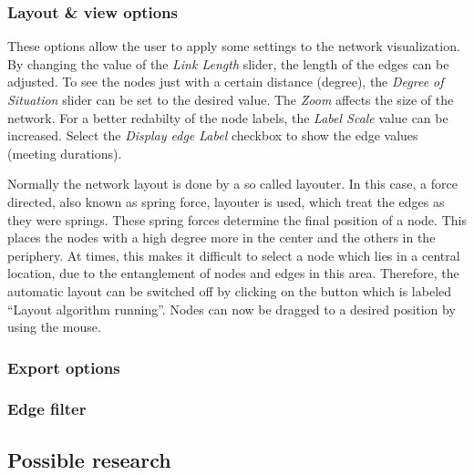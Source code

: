 \subsubsection*{Layout \& view options}

These options allow the user to apply some settings to the network visualization. By changing the value of the \textit{Link Length} slider, the length of the edges can be adjusted. To see the nodes just with a certain distance (degree), the \textit{Degree of Situation} slider can be set to the desired value. The \textit{Zoom} affects the size of the network. For a better redabilty of the node labels, the \textit{Label Scale} value can be increased. Select the \textit{Display edge Label} checkbox to show the edge values (meeting durations).

Normally the network layout is done by a so called layouter. In this case, a force directed, also known as spring force, layouter is used, which treat the edges as they were springs. These spring forces determine the final position of a node. This places the nodes with a high degree more in the center and the others in the periphery. At times, this makes it difficult to select a node which lies in a central location, due to the entanglement of nodes and edges in this area. Therefore, the automatic layout can be switched off by clicking on the button which is labeled ``Layout algorithm running''. Nodes can now be dragged to a desired position by using the mouse. 

\subsubsection*{Export options}

\subsubsection*{Edge filter}

\subsection{Possible research}
\label{subsec:graph_research}
